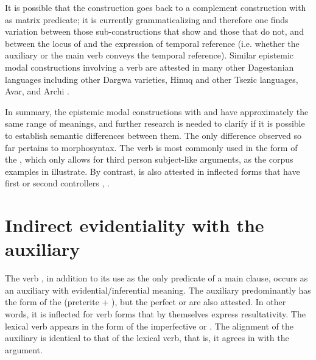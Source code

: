 It is possible that the construction goes back to a complement construction with  as matrix predicate; it is currently grammaticalizing and therefore one finds variation between those sub-constructions that show  and those that do not, and between the locus of  and the expression of temporal reference (i.e. whether the auxiliary or the main verb conveys the temporal reference). Similar epistemic modal constructions involving a verb  are attested in many other Dagestanian languages including other Dargwa varieties, Hinuq and other Tsezic languages, Avar, and Archi \citep{Forker2018a, Forker2018b}.

In summary, the epistemic modal constructions with   and   have approximately the same range of meanings, and further research is needed to clarify if it is possible to establish semantic differences between them. The only difference observed so far pertains to morphosyntax. The verb  is most commonly used in the form of the , which only allows for third person subject-like arguments, as the corpus examples in  illustrate. By contrast,  is also attested in inflected forms that have first or second  controllers , .



\section{Indirect evidentiality with the auxiliary \protect{} \protect{}}
\label{sec:Indirect evidentiality with the auxiliary b-uz be, be at, stay, remain}

The verb  , in addition to its use as the only predicate of a main clause, occurs as an auxiliary with evidential\slash inferential meaning. The auxiliary predominantly has the form of the  (preterite + ), but the perfect or  are also attested. In other words, it is inflected for verb forms that by themselves express resultativity. The lexical verb appears in the form of the imperfective or . The alignment of the auxiliary is identical to that of the lexical verb, that is, it agrees in  with the  argument.

